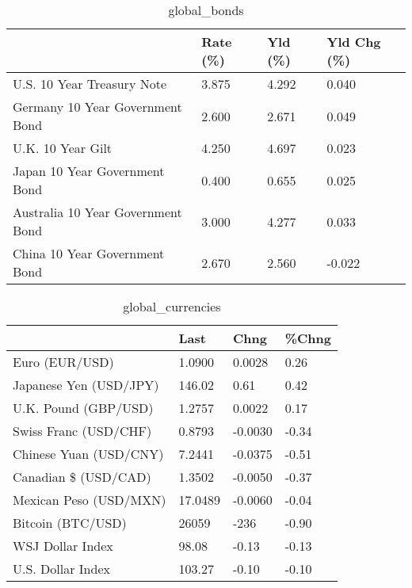 \documentclass{article}%
\begin{document}
%


\begin{table}[htbp]%
\caption{global\_bonds}%
\centering%
\begin{adjustbox}{width=1\textwidth}%
\begin{tabular}{llll}
\toprule
                                  & Rate (\%) & Yld (\%) & Yld Chg (\%) \\
\midrule
       U.S. 10 Year Treasury Note &    3.875 &   4.292 &       0.040 \\
  Germany 10 Year Government Bond &    2.600 &   2.671 &       0.049 \\
                U.K. 10 Year Gilt &    4.250 &   4.697 &       0.023 \\
    Japan 10 Year Government Bond &    0.400 &   0.655 &       0.025 \\
Australia 10 Year Government Bond &    3.000 &   4.277 &       0.033 \\
    China 10 Year Government Bond &    2.670 &   2.560 &      -0.022 \\
\bottomrule
\end{tabular}
%
\end{adjustbox}%
\end{table}

%


\begin{table}[htbp]%
\caption{global\_currencies}%
\centering%
\begin{adjustbox}{width=1\textwidth}%
\begin{tabular}{llll}
\toprule
                       &    Last &    Chng & \%Chng \\
\midrule
        Euro (EUR/USD) &  1.0900 &  0.0028 &  0.26 \\
Japanese Yen (USD/JPY) &  146.02 &    0.61 &  0.42 \\
  U.K. Pound (GBP/USD) &  1.2757 &  0.0022 &  0.17 \\
 Swiss Franc (USD/CHF) &  0.8793 & -0.0030 & -0.34 \\
Chinese Yuan (USD/CNY) &  7.2441 & -0.0375 & -0.51 \\
  Canadian \$ (USD/CAD) &  1.3502 & -0.0050 & -0.37 \\
Mexican Peso (USD/MXN) & 17.0489 & -0.0060 & -0.04 \\
     Bitcoin (BTC/USD) &   26059 &    -236 & -0.90 \\
      WSJ Dollar Index &   98.08 &   -0.13 & -0.13 \\
     U.S. Dollar Index &  103.27 &   -0.10 & -0.10 \\
\bottomrule
\end{tabular}
%
\end{adjustbox}%
\end{table}
\end{document}

